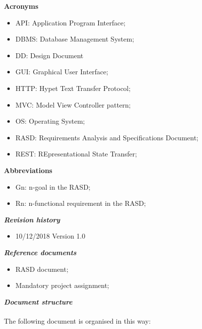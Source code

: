 \begin{legal}
\begin{legal}
\begin{itemize}
				\end{itemize}
				\item \textbf{Acronyms}\\
				\begin{itemize}
					\item API: Application Program Interface;
					\item DBMS: Database Management System;
					\item DD: Design Document
					\item GUI: Graphical User Interface;
					\item HTTP: Hypet Text Transfer Protocol;
					\item MVC: Model View Controller pattern;
					\item OS: Operating System;
					\item RASD: Requirements Analysis and Specifications Document;
					\item REST: REpresentational State Transfer;\\
				\end{itemize}
				\item \textbf{Abbreviations}\\
				\begin{itemize}
					\item Gn: n-goal in the RASD;
					\item Rn: n-functional requirement in the RASD;\\
				\end{itemize}
			\end{legal}
		\item \textit{\textbf{Revision history}}\\
			\begin{itemize}
				\item 10/12/2018		Version 1.0\\
			\end{itemize}
		\item \textit{\textbf{Reference documents}}\\
			\begin{itemize}
				\item RASD document;
				\item Mandatory project assignment;\\
			\end{itemize}
		\item \textit{\textbf{Document structure}}\\\\
		The following document is organised in this way:

\end{legal}
